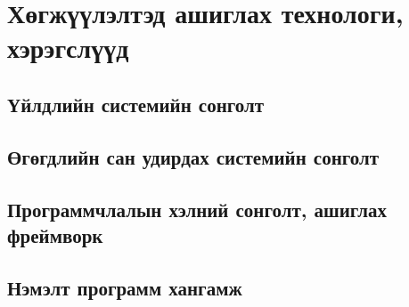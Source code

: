 \chapter{Хөгжүүлэлтэд ашиглах технологи, хэрэгслүүд}
\label{chapter2}

\section{Үйлдлийн системийн сонголт}
\section{Өгөгдлийн сан удирдах системийн сонголт}

\section{Программчлалын хэлний сонголт, ашиглах фреймворк}

\section{Нэмэлт программ хангамж}

